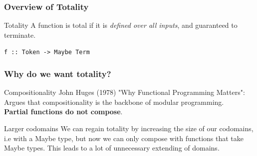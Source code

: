 \documentclass
  [hyperref={colorlinks = true,linkcolor = blue, 
             citecolor = blue, urlcolor = blue}
  ]{beamer}
\begin{document}
\begin{frame}[fragile]
  \frametitle{Overview of Totality}
\begin{block}{Totality}
A function is total if it is \textit{defined over all
inputs}, and guaranteed to terminate.
\end{block}
\texttt{f :: Token -> Maybe Term}
\end{frame}

\begin{frame}[fragile]
\frametitle{Why do we want totality?}
\begin{block}{Compositionality}
John Huges (1978) "Why Functional Programming Matters":
Argues that compositionality is the backbone of modular
programming. \\ \textbf{Partial functions do not compose}.
\end{block}
\begin{block}{Larger codomains}
We can regain totality by increasing the size of our
codomains, i.e with a Maybe type, but now we can only compose
with functions that take Maybe types. This leads to a lot of
unnecessary extending of domains.
\end{block}
\end{frame}
\end{document}
